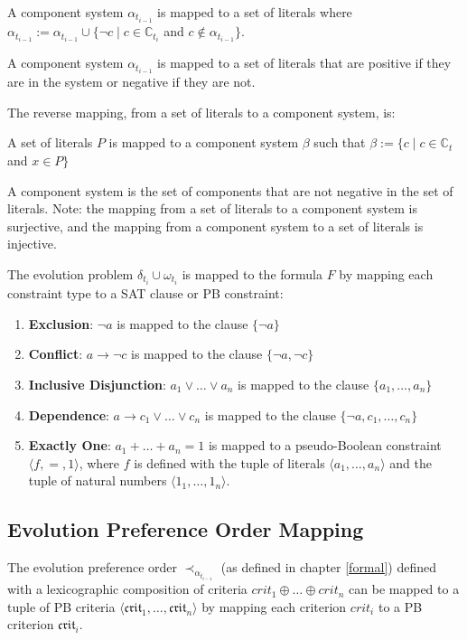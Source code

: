 \begin{defs}
	A component system $\alpha_{t_{i-1}}$ is mapped to a set of literals where
   $\alpha_{t_{i-1}} := \alpha_{t_{i-1}} \cup \{\neg c \mid c \in \mathbb{C}_{t_i}$ and $ c \not \in \alpha_{t_{i-1}}\}$.
\end{defs}
A component system $\alpha_{t_{i-1}}$ is mapped to a set of literals that are positive if they are in the system or negative if they are not.

The reverse mapping, from a set of literals to a component system, is:
\begin{defs}
A set of literals $P$ is mapped to a component system $\beta$ such that $\beta := \{c \mid c \in \mathbb{C}_t$ and $x \in P\}$
\end{defs}
A component system is the set of components that are not negative in the set of literals.  
Note: the mapping from a set of literals to a component system is surjective, and the mapping from a component system to a set of literals is injective.

The evolution problem $\delta_{t_i} \cup \omega_{t_i}$ is mapped to the formula $F$
by mapping each constraint type to a SAT clause or PB constraint:
\begin{enumerate}
  \item \textbf{Exclusion}: $\neg a$ is mapped to the clause $\{\neg a\}$
  \item \textbf{Conflict}: $a \rightarrow \neg c $ is mapped to the clause $\{\neg a, \neg c\}$ 
  \item \textbf{Inclusive Disjunction}: $a_1 \vee \ldots \vee a_n $ is mapped to the clause $\{a_1, \ldots,  a_n\}$ 
  \item \textbf{Dependence}: $a \rightarrow c_1 \vee \ldots \vee c_n $ is mapped to the clause $ \{\neg a, c_1, \ldots, c_n\}$
  \item \textbf{Exactly One}: $a_1 + \ldots + a_n = 1 $ is mapped to a pseudo-Boolean constraint $\langle f,=, 1 \rangle$, 
  where $f$ is defined with the tuple of literals $\langle a_1 ,\ldots , a_n\rangle$ and the tuple of natural numbers $\langle 1_1,\ldots,1_n \rangle$.
\end{enumerate}


\subsection{Evolution Preference Order Mapping}
\label{impl.mappingexample}
The evolution preference order $\prec_{\alpha_{t_{i-1}}}$ (as defined in chapter \ref{formal}) defined with a lexicographic composition of criteria $crit_{1} \oplus \ldots \oplus crit_{n}$ 
can be mapped to a tuple of PB criteria $\langle \mathfrak{crit}_1,\ldots,\mathfrak{crit}_n\rangle$
by mapping each criterion $crit_{i}$ to a PB criterion $\mathfrak{crit}_i$.

